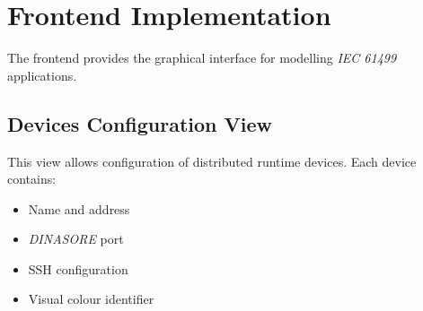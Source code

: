 




\section{Frontend Implementation}

The frontend provides the graphical interface for modelling \textit{IEC 61499} applications.

\subsection{Devices Configuration View}

This view allows configuration of distributed runtime devices. Each device contains:
\begin{itemize}
    \item Name and address
    \item \textit{DINASORE} port
    \item SSH configuration
    \item Visual colour identifier
\end{itemize}

